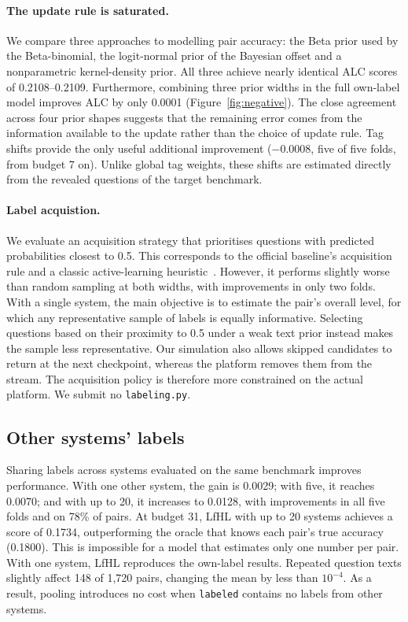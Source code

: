 \documentclass{article}
\newcommand{\lfhl}{LfHL}
\newcommand{\code}[1]{\texttt{#1}}
\newcommand{\labeled}{\code{labeled}}
\begin{document}
\paragraph{The update rule is saturated.} We compare three approaches to modelling pair accuracy: the Beta prior used by the Beta-binomial, the logit-normal prior of the Bayesian offset and a nonparametric kernel-density prior. All three achieve nearly identical ALC scores of 0.2108--0.2109. Furthermore, combining three prior widths in the full own-label model improves ALC by only 0.0001 (Figure~\ref{fig:negative}). The close agreement across four prior shapes suggests that the remaining error comes from the information available to the update rather than the choice of update rule. Tag shifts provide the only useful additional improvement ($-0.0008$, five of five folds, from budget 7 on). Unlike global tag weights, these shifts are estimated directly from the revealed questions of the target benchmark.

\paragraph{Label acquistion.} We evaluate an acquisition strategy that prioritises questions with predicted probabilities closest to 0.5. This corresponds to the official baseline's acquisition rule and a classic active-learning heuristic~\citep{settles.tr09}. However, it performs slightly worse than random sampling at both widths, with improvements in only two folds. With a single system, the main objective is to estimate the pair's overall level, for which any representative sample of labels is equally informative. Selecting questions based on their proximity to 0.5 under a weak text prior instead makes the sample less representative. Our simulation also allows skipped candidates to return at the next checkpoint, whereas the platform removes them from the stream. The acquisition policy is therefore more constrained on the actual platform. We submit no \code{labeling.py}.

\subsection{Other systems' labels}
\label{sec:others}

Sharing labels across systems evaluated on the same benchmark improves performance. With one other system, the gain is 0.0029; with five, it reaches 0.0070; and with up to 20, it increases to 0.0128, with improvements in all five folds and on 78\% of pairs. At budget 31, \lfhl{} with up to 20 systems achieves a score of 0.1734, outperforming the oracle that knows each pair's true accuracy (0.1800). This is impossible for a model that estimates only one number per pair. With one system, \lfhl{} reproduces the own-label results. Repeated question texts slightly affect 148 of 1{,}720 pairs, changing the mean by less than $10^{-4}$. As a result, pooling introduces no cost when \labeled{} contains no labels from other systems.
\end{document}
